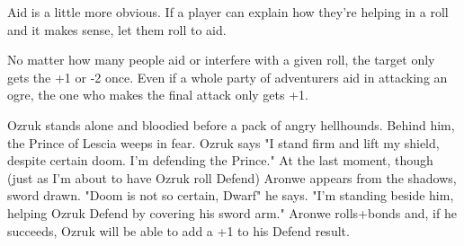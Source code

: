  

Aid is a little more obvious. If a player can explain how they're helping in a roll and it makes sense, let them roll to aid.

 

No matter how many people aid or interfere with a given roll, the target only gets the +1 or -2 once. Even if a whole party of adventurers aid in attacking an ogre, the one who makes the final attack only gets +1.

 
\startExample
Ozruk stands alone and bloodied before a pack of angry hellhounds. Behind him, the Prince of Lescia weeps in fear. Ozruk says "I stand firm and lift my shield, despite certain doom. I'm defending the Prince." At the last moment, though (just as I'm about to have Ozruk roll Defend) Aronwe appears from the shadows, sword drawn. "Doom is not so certain, Dwarf" he says. "I'm standing beside him, helping Ozruk Defend by covering his sword arm." Aronwe rolls+bonds and, if he succeeds, Ozruk will be able to add a +1 to his Defend result.
\stopExample
 
